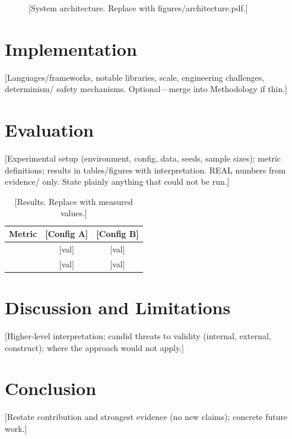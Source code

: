 \documentclass[conference]{IEEEtran}
\begin{document}
\begin{figure}[t]
  \centering
  \caption{[System architecture. Replace with figures/architecture.pdf.]}
  \label{fig:arch}
\end{figure}

\section{Implementation}\label{sec:impl}
[Languages/frameworks, notable libraries, scale, engineering challenges, determinism/
safety mechanisms. Optional---merge into Methodology if thin.]

\section{Evaluation}\label{sec:eval}
[Experimental setup (environment, config, data, seeds, sample sizes); metric definitions;
results in tables/figures with interpretation. REAL numbers from evidence/ only. State
plainly anything that could not be run.]

\begin{table}[t]
  \centering
  \caption{[Results. Replace with measured values.]}
  \label{tab:results}
  \begin{tabular}{lcc}
    \toprule
    Metric & [Config A] & [Config B] \\
    \midrule
    [metric 1] & [val] & [val] \\
    [metric 2] & [val] & [val] \\
    \bottomrule
  \end{tabular}
\end{table}

\section{Discussion and Limitations}\label{sec:discussion}
[Higher-level interpretation; candid threats to validity (internal, external, construct);
where the approach would not apply.]

\section{Conclusion}\label{sec:conclusion}
[Restate contribution and strongest evidence (no new claims); concrete future work.]



\end{document}
